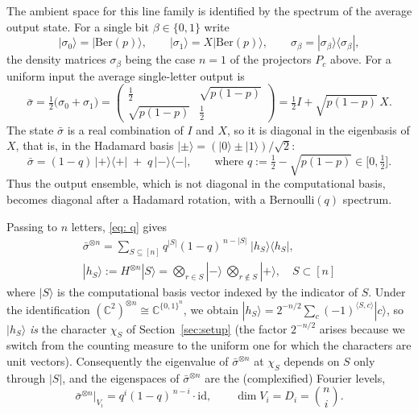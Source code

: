 \documentclass[11pt]{amsart}
\theoremstyle{plain}
\theoremstyle{remark}
\newcommand{\C}{\mathbb{C}}
\newcommand{\la}{\langle}
\newcommand{\ra}{\rangle}
\begin{document}
The ambient space for this line family is identified by the spectrum of
the average output state. For a single bit $\beta\in\{0,1\}$ write
\[
 |\sigma_0\ra=|\mathrm{Ber}(p)\ra,\qquad
 |\sigma_1\ra=X|\mathrm{Ber}(p)\ra,\qquad
 \sigma_\beta=|\sigma_\beta\ra\la\sigma_\beta| ,
\]
the density matrices $\sigma_\beta$ being the case $n=1$ of the projectors $P_c$
above. 
For a uniform input the average single-letter output is
\begin{equation}\label{eq: sigmabar}
 \bar\sigma=\tfrac12\bigl(\sigma_0+\sigma_1\bigr)
 =\begin{pmatrix}\frac12&\sqrt{p(1-p)}\\[3pt]
 \sqrt{p(1-p)}&\frac12\end{pmatrix}
 =\tfrac12 I+\sqrt{p(1-p)}\,X .
\end{equation}
The state $\bar\sigma$ is a real combination of $I$ and $X$, so it is diagonal in
the eigenbasis of $X$, that is, in the Hadamard basis
$|\pm\ra=(|0\ra\pm|1\ra)/\sqrt2$:
\begin{equation}\label{eq: q}
 \bar\sigma=(1-q)\,|+\ra\la+|\;+\;q\,|-\ra\la-| ,
 \qquad \text{where }q:=\tfrac12-\sqrt{p(1-p)}\in\bigl[0,\tfrac12\bigr].
\end{equation}
Thus the output ensemble, which is not diagonal in the computational basis,
becomes diagonal after a Hadamard rotation, with a Bernoulli$(q)$ spectrum.

Passing to $n$ letters, \eqref{eq: q} gives
   \begin{gather*}
 \bar\sigma^{\otimes n}
 =\sum_{S\subseteq[n]}q^{|S|}(1-q)^{\,n-|S|}\;|h_S\ra\la h_S| ,\\ 
 |h_S\ra:=H^{\otimes n}|S\ra
 =\bigotimes_{r\in S}|-\ra\ \bigotimes_{r\notin S}|+\ra ,  \quad S\subset[n]     
   \end{gather*}
where $|S\ra$ is the computational basis vector indexed by the indicator of
$S$. Under the identification $(\C^2)^{\otimes n}\cong\C^{\{0,1\}^n}$, %
we obtain
$|h_S\ra=2^{-n/2}\sum_{c}(-1)^{\la S,c\ra}|c\ra$, so $|h_S\ra$ \emph{is} the
character $\chi_S$ of Section~\ref{sec:setup} (the factor $2^{-n/2}$ 
arises because we switch from the counting measure to the uniform one for which the
characters are unit vectors). Consequently the eigenvalue of
$\bar\sigma^{\otimes n}$ at $\chi_S$ depends on $S$ only through $|S|$, and the
eigenspaces of $\bar\sigma^{\otimes n}$ are the (complexified) Fourier levels,
\[
 \bar\sigma^{\otimes n}\big|_{V_i}=q^{i}(1-q)^{\,n-i}\cdot\mathrm{id},
 \qquad \dim V_i=D_i=\binom ni .
\]
\end{document}
